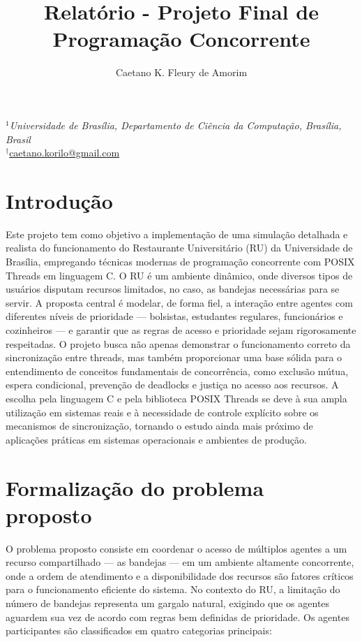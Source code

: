 \documentclass[10pt,a4paper]{article}
\title{\textbf{Relatório - Projeto Final de Programação Concorrente}}
\author{
        Caetano K. Fleury de Amorim
	}
\date{}
\newcommand\blfootnote[1]{%
  \begingroup
  \renewcommand\thefootnote{}\footnote{#1}%
  \addtocounter{footnote}{-1}%
  \endgroup
}
\begin{document}
    \maketitle
	\vspace{-0.6cm}
	\begin{center}\small
		$^1$\textit{Universidade de Brasília, Departamento de Ciência da Computação, Brasília, Brasil}\\
		\phantom{.}\hfill
		$^{\dag}$\url{caetano.korilo@gmail.com}\hfill
		\phantom{.}
	\end{center}
	

\onehalfspace

\section{Introdução}

Este projeto tem como objetivo a implementação de uma simulação detalhada e realista do funcionamento do Restaurante Universitário (RU) da Universidade de Brasília, empregando técnicas modernas de programação concorrente com POSIX Threads em linguagem C. O RU é um ambiente dinâmico, onde diversos tipos de usuários disputam recursos limitados, no caso, as bandejas necessárias para se servir. A proposta central é modelar, de forma fiel, a interação entre agentes com diferentes níveis de prioridade — bolsistas, estudantes regulares, funcionários e cozinheiros — e garantir que as regras de acesso e prioridade sejam rigorosamente respeitadas. O projeto busca não apenas demonstrar o funcionamento correto da sincronização entre threads, mas também proporcionar uma base sólida para o entendimento de conceitos fundamentais de concorrência, como exclusão mútua, espera condicional, prevenção de deadlocks e justiça no acesso aos recursos. A escolha pela linguagem C e pela biblioteca POSIX Threads se deve à sua ampla utilização em sistemas reais e à necessidade de controle explícito sobre os mecanismos de sincronização, tornando o estudo ainda mais próximo de aplicações práticas em sistemas operacionais e ambientes de produção.

\section{Formalização do problema proposto}

O problema proposto consiste em coordenar o acesso de múltiplos agentes a um recurso compartilhado — as bandejas — em um ambiente altamente concorrente, onde a ordem de atendimento e a disponibilidade dos recursos são fatores críticos para o funcionamento eficiente do sistema. No contexto do RU, a limitação do número de bandejas representa um gargalo natural, exigindo que os agentes aguardem sua vez de acordo com regras bem definidas de prioridade. Os agentes participantes são classificados em quatro categorias principais:
\end{document}
